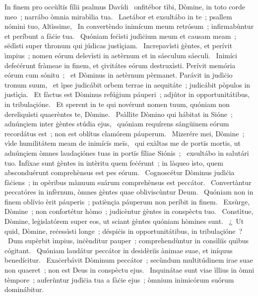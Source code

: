 { In finem pro occùltïs fílii psalmus Davídi}
{%
~onfitébor tìbi, Dòmine, in toto corde meo~; narrábo òmnia mirabìlia tua.
~Laetábor et exsultábo in te~; psallem nómini tuo, Altìssime,
~In convertèndo inimícum meum retrósum~; infirmabùntur et períbunt a fàċie tua.
~Quóniam feċìsti judìċium meum et causam meam~; sëdìsti super thronum qui júdicas justìçiam.
~Increpavìsti ġèntes, et perívit ìmpius~; nomen eórum delevìsti in aetèrnum et in sáeculum sáeculi.
~Inimíci defeċérunt fràmeae in finem, et çivitátes eórum destruxìsti. Perívit memória eórum cum sónitu~;
~et Dòminus in aetèrnum pèrmanet. Parávit in judìċio tronum suum,
~et ìpse judicábit orbem terrae in aequitáte~; judicábit pòpulos in justìçia.
~Et fàctus est Dòminus refúġium páuperi~; adjútor in opportunitátibus, in tribulaçióne.
~Et sperent in te qui novérunt nomen tuum, quóniam non dereliquìsti quaerèntes te, Dòmine.
~Psàllite Dòmino qui hábitat in Sióne~; adnúnçiem inter ġèntes stúdia ejus,
~quóniam requírens sángüinem eórum recordátus est~; non est oblítus clamórem páuperum.
~Mizerére mei, Dòmine~; vìde humilitátem meam de inimícïs meïs,
~qui exàltas me de portïs mortis, ut adnúnçiem òmnes laudaçiónes tuas in portïs fíliae Siónis~;
~exsultábo in salutári tuo. Infíxae sunt ġèntes in intèritu quem feċérunt~; in làqueo ìsto, quem absconduérunt comprehènsus est pes eórum.
~Cognoscétur Dòminus judìċia fàċiens~; in opèribus mànuum suárum comprehènsus est peccátor.
~Convertàntur peccatóres in infèrnum, òmnes ġèntes quae obliviscùntur Deum.
~Quóniam non in finem oblívio èrit páuperis~; patiènçia páuperum non períbit in finem.
~Exsùrge, Dòmine~; non confortétur hòmo~; judicèntur ġèntes in conspèctu tuo.
~Constìtue, Dòmine, leġislatórem super eos, ut sciant ġèntes quóniam hòmines sunt.
~¿~Ut quid, Dòmine, reċessìsti longe~; déspiċis in opportunitátibus, in tribulaçióne~?
~Dum supèrbit ìmpius, inċènditur pauper~; comprehendùntur in consìliïs quìbus cógitant.
~Quóniam laudátur peccátor in desidèriïs ànimae suae, et iníquus benedícitur.
~Exaċerbávit Dòminum peccátor~; secùndum multitúdinem irae suae non quaeret~; non est Deus in conspèctu ejus.
~Inquinátae sunt viae ìllius in òmni tèmpore~; auferùntur judìċia tua a fàċie ejus~; òmnium inimicórum suórum dominábitur.
}
